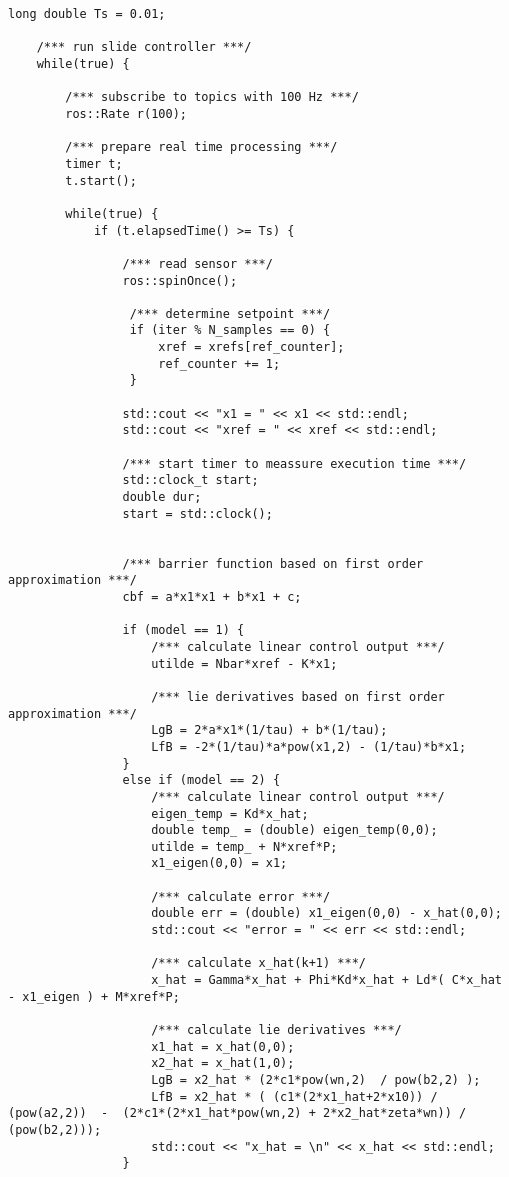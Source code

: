 \begin{lstlisting}[language=gedit]
    long double Ts = 0.01;

    /*** run slide controller ***/
    while(true) {

        /*** subscribe to topics with 100 Hz ***/
        ros::Rate r(100);

        /*** prepare real time processing ***/
        timer t;
        t.start();

        while(true) {
            if (t.elapsedTime() >= Ts) {
              
                /*** read sensor ***/ 
                ros::spinOnce();
 
                 /*** determine setpoint ***/
                 if (iter % N_samples == 0) {
                     xref = xrefs[ref_counter];
                     ref_counter += 1; 
                 }
          
                std::cout << "x1 = " << x1 << std::endl;
                std::cout << "xref = " << xref << std::endl;
 
                /*** start timer to meassure execution time ***/
                std::clock_t start;
                double dur;
                start = std::clock();               
               

                /*** barrier function based on first order approximation ***/
                cbf = a*x1*x1 + b*x1 + c;

                if (model == 1) {
                    /*** calculate linear control output ***/
                    utilde = Nbar*xref - K*x1;

                    /*** lie derivatives based on first order approximation ***/
                    LgB = 2*a*x1*(1/tau) + b*(1/tau);
                    LfB = -2*(1/tau)*a*pow(x1,2) - (1/tau)*b*x1;
                }
                else if (model == 2) {
                    /*** calculate linear control output ***/
                    eigen_temp = Kd*x_hat;
                    double temp_ = (double) eigen_temp(0,0);
                    utilde = temp_ + N*xref*P;
                    x1_eigen(0,0) = x1;

                    /*** calculate error ***/
                    double err = (double) x1_eigen(0,0) - x_hat(0,0);
                    std::cout << "error = " << err << std::endl;

                    /*** calculate x_hat(k+1) ***/
                    x_hat = Gamma*x_hat + Phi*Kd*x_hat + Ld*( C*x_hat - x1_eigen ) + M*xref*P;

                    /*** calculate lie derivatives ***/
                    x1_hat = x_hat(0,0);
                    x2_hat = x_hat(1,0);
                    LgB = x2_hat * (2*c1*pow(wn,2)  / pow(b2,2) );
                    LfB = x2_hat * ( (c1*(2*x1_hat+2*x10)) / (pow(a2,2))  -  (2*c1*(2*x1_hat*pow(wn,2) + 2*x2_hat*zeta*wn)) / (pow(b2,2)));          
                    std::cout << "x_hat = \n" << x_hat << std::endl;
                }


\end{lstlisting}
